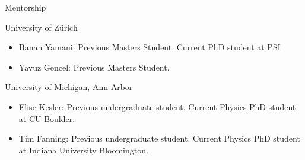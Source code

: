 \documentclass{resume} %
\begin{document}
\begin{rSection}{Mentorship}
\begin{rSubsection}{University of Zürich}{}{}{}
    \begin{itemize}
    \item Banan Yamani: Previous Masters Student. Current PhD student at \ac{PSI}
    \item Yavuz Gencel: Previous Masters Student. 
    \end{itemize}
\end{rSubsection}

\begin{rSubsection}{University of Michigan, Ann-Arbor}{}{}{}
\begin{itemize}
    \item Elise Kesler: Previous undergraduate student. Current Physics PhD student at CU Boulder.
    \item Tim Fanning: Previous undergraduate student. Current Physics PhD student at Indiana University Bloomington.
\end{itemize}
\end{rSubsection}

\end{rSection}





%

\end{document}

